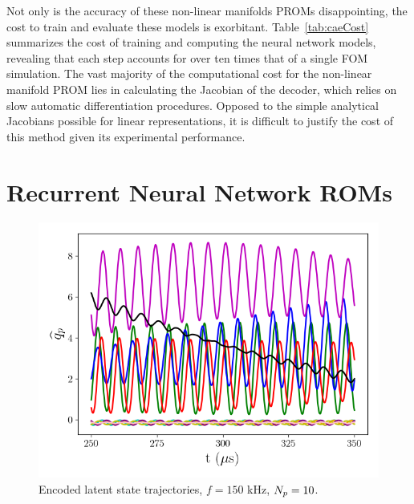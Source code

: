Not only is the accuracy of these non-linear manifolds PROMs disappointing, the cost to train and evaluate these models is exorbitant. Table~\ref{tab:caeCost} summarizes the cost of training and computing the neural network models, revealing that each step accounts for over ten times that of a single FOM simulation. The vast majority of the computational cost for the non-linear manifold PROM lies in calculating the Jacobian of the decoder, which relies on slow automatic differentiation procedures. Opposed to the simple analytical Jacobians possible for linear representations, it is difficult to justify the cost of this method given its experimental performance.

\section{Recurrent Neural Network ROMs}

\begin{figure}
    \centering
    \includegraphics[width=0.6\linewidth]{Chapters/TransientFlame/Images/nonlinear/latent_vars.png}
    \caption{Encoded latent state trajectories, $f = 150$ kHz, $N_p = 10$.}
\end{figure}

